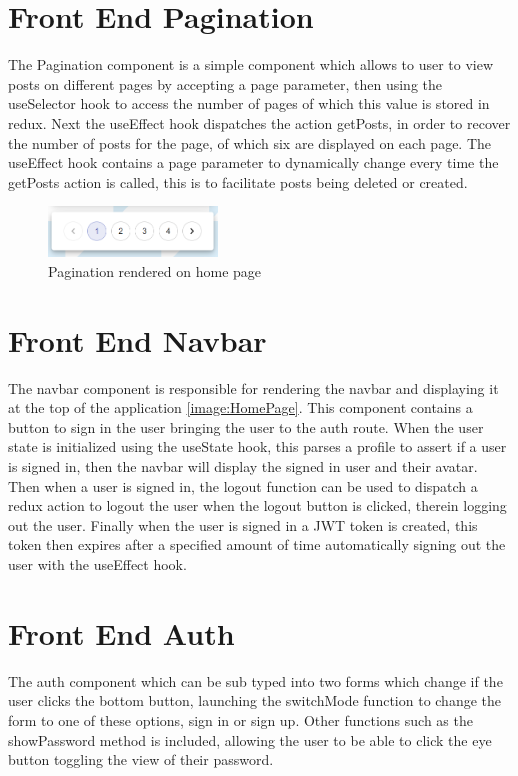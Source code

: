 \section{Front End Pagination}
The Pagination component is a simple component which allows to user to view posts on different pages by accepting a page parameter, then using the useSelector hook to access the number of pages of which this value is stored in redux. Next the useEffect hook dispatches the action getPosts, in order to recover the number of posts for the page, of which six are displayed on each page. The useEffect hook contains a page parameter to dynamically change every time the getPosts action is called, this is to facilitate posts being deleted or created.
\begin{figure}[h!]
    \centering
    \includegraphics[width=0.4\textwidth]{images/paginate.png}
    \caption{Pagination rendered on home page}
    \label{image:Paginate}
\end{figure}

\section{Front End Navbar}\label{section:navabr}
The navbar component is responsible for rendering the navbar and displaying it at the top of the application \ref{image:HomePage}. This component contains a button to sign in the user bringing the user to the auth route. When the user state is initialized using the useState hook, this parses a profile to assert if a user is signed in, then the navbar will display the signed in user and their avatar. Then when a user is signed in, the logout function can be used to dispatch a redux action to logout the user when the logout button is clicked, therein logging out the user. Finally when the user is signed in a JWT token is created, this token then expires after a specified amount of time automatically signing out the user with the useEffect hook.

\section{Front End Auth}
The auth component which can be sub typed into two forms which change if the user clicks the bottom button, launching the switchMode function to change the form to one of these options, sign in or sign up. Other functions such as the showPassword method is included, allowing the user to be able to click the eye button toggling the view of their password.

